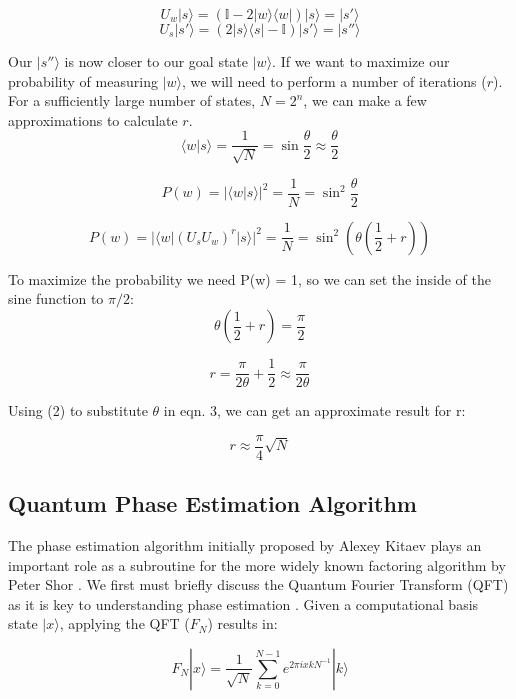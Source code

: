 \documentclass[twocolumn,showpacs,preprintnumbers,amsmath,amssymb]{revtex4}
\begin{document}
		$$ U_w|s \rangle	=  (\mathbb {I} - 2|w \rangle \langle w|) |s \rangle = |s'\rangle$$
		$$ U_s|s' \rangle	=  (2|s \rangle \langle s| - \mathbb {I}) |s' \rangle = |s''\rangle$$
		
		Our $|s''\rangle$ is now closer to our goal state $|w\rangle$.  If we want to maximize our probability of measuring  $|w\rangle$, we will need to perform a number of iterations ($r$). For a sufficiently large number of states, $N = 2^n$, we can make a few approximations to calculate $r$.
		\begin{equation}
			\langle w | s \rangle = \frac{1}{\sqrt{N}} = \sin \frac{\theta}{2} \approx \frac{\theta}{2}
		\end{equation}
		
		
		$$P(w) = |\langle w | s \rangle|^2 = \frac{1}{N} = \sin^2 \frac{\theta}{2} $$
		
		$$P(w) = |\langle w |(U_sU_w)^r |s \rangle|^2 = \frac{1}{N} = \sin^2 \left(\theta\left(\frac{1}{2} + r\right)\right) $$
		
		To maximize the probability we need P(w) = 1, so we can set the inside of the sine function to $\pi/2$:
		$$ \theta \left(\frac{1}{2} + r \right) = \frac{\pi}{2}$$
		
		\begin{equation}
			r = \frac{\pi}{2\theta} + \frac{1}{2} \approx \frac{\pi}{2\theta}
		\end{equation}
		
		Using (2) to substitute $\theta$ in eqn. 3, we can get an approximate result for r:
		
		\begin{equation}
			r \approx \frac{\pi}{4}\sqrt{N}
		\end{equation}
		
		
		\subsection{Quantum Phase Estimation Algorithm}
		
		The phase estimation algorithm initially proposed by Alexey Kitaev \cite{kitaev1995quantum} plays an important role as a subroutine for the more widely known factoring algorithm by Peter Shor \cite{Shor}. We first must briefly discuss the Quantum Fourier Transform (QFT) as it is key to understanding phase estimation \cite{nielsen00}. Given a computational basis state $|x\rangle$, applying the QFT ($F_N$) results in:
		
		$$ F_N |x \rangle = \frac{1}{\sqrt{N}} \sum_{k=0}^{N-1} e^{2\pi i x k N^{-1}} |k\rangle $$
		
\end{document}
